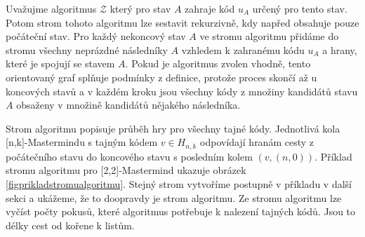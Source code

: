 \begin{pozn}
    Uvažujme algoritmus $\mathcal{Z}$ který pro stav $A$ zahraje kód $u_A$ určený pro tento stav. Potom strom tohoto algoritmu lze sestavit rekurzivně, kdy napřed obsahuje pouze počáteční stav. Pro každý nekoncový stav $A$ ve stromu algoritmu přidáme do stromu všechny neprázdné následníky $A$ vzhledem k zahranému kódu $u_A$ a hrany, které je spojují se stavem $A$. 
    Pokud je algoritmus zvolen vhodně, tento orientovaný graf splňuje podmínky z definice, protože proces skončí až u koncových stavů a v každém kroku jsou všechny kódy z množiny kandidátů stavu $A$ obsaženy v množině kandidátů nějakého následníka.
\end{pozn}
 Strom algoritmu popisuje průběh hry pro všechny tajné kódy. Jednotlivá kola [n,k]-Mastermindu s tajným kódem $v\in H_{n,k}$ odpovídají hranám cesty z počátečního stavu do koncového stavu s posledním kolem $(v,(n,0))$. Příklad stromu algoritmu pro [2,2]-Mastermind ukazuje obrázek \ref{figprikladstromualgoritmu}. Stejný strom vytvoříme postupně v příkladu v další sekci a ukážeme, že to doopravdy je strom algoritmu. Ze stromu algoritmu lze vyčíst počty pokusů, které algoritmus potřebuje k nalezení tajných kódů. Jsou to délky cest od kořene k listům.




